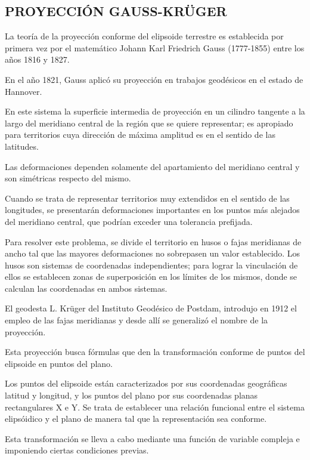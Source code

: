 \documentclass[]{article}
\date{}
\begin{document}
\hypertarget{proyecciuxf3n-gauss-kruxfcger}{%
\subsection{PROYECCIÓN
GAUSS-KRÜGER}\label{proyecciuxf3n-gauss-kruxfcger}}

La teoría de la proyección conforme del elipsoide terrestre es
establecida por primera vez por el matemático Johann Karl Friedrich
Gauss (1777-1855) entre los años 1816 y 1827.

En el año 1821, Gauss aplicó su proyección en trabajos geodésicos en el
estado de Hannover.

En este sistema la superficie intermedia de proyección en un cilindro
tangente a la largo del meridiano central de la región que se quiere
representar; es apropiado para territorios cuya dirección de máxima
amplitud es en el sentido de las latitudes.

Las deformaciones dependen solamente del apartamiento del meridiano
central y son simétricas respecto del mismo.

Cuando se trata de representar territorios muy extendidos en el sentido
de las longitudes, se presentarán deformaciones importantes en los
puntos más alejados del meridiano central, que podrían exceder una
tolerancia prefijada.

Para resolver este problema, se divide el territorio en husos o fajas
meridianas de ancho tal que las mayores deformaciones no sobrepasen un
valor establecido. Los husos son sistemas de coordenadas independientes;
para lograr la vinculación de ellos se establecen zonas de superposición
en los límites de los mismos, donde se calculan las coordenadas en ambos
sistemas.

El geodesta L. Krüger del Instituto Geodésico de Postdam, introdujo en
1912 el empleo de las fajas meridianas y desde allí se generalizó el
nombre de la proyección.

Esta proyección busca fórmulas que den la transformación conforme de
puntos del elipsoide en puntos del plano.

Los puntos del elipsoide están caracterizados por sus coordenadas
geográficas latitud y longitud, y los puntos del plano por sus
coordenadas planas rectangulares X e Y. Se trata de establecer una
relación funcional entre el sistema elipsóidico y el plano de manera tal
que la representación sea conforme.

Esta transformación se lleva a cabo mediante una función de variable
compleja e imponiendo ciertas condiciones previas.
\end{document}
